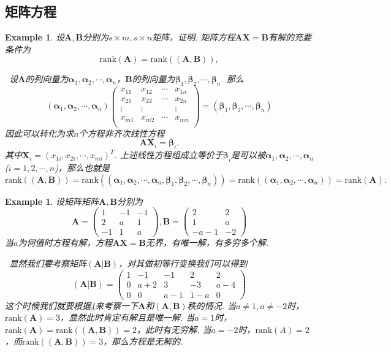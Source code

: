 \documentclass{article}
\newtheorem{example}[theorem]{Example}
\newcommand{\hints}{{\color{blue} \text{hints}}}
\newcommand{\mbf}[1]{\bm{#1}}
\newcommand{\rank}[1]{\text{rank}\left(#1\right)} %
\begin{document}
\subsection{矩阵方程}

\begin{example}\label{matrix-equation-1}
\rm 设$\mbf{A},\mbf{B}$分别为$s \times m,s \times n$矩阵，证明: 矩阵方程$\mbf{A}\mbf{X} = \mbf{B}$有解的充要条件为
$$
\rank{\mbf{A}} = \rank{(\mbf{A},\mbf{B})},
$$

\hints\ 设$\mbf{A}$的列向量为$\mbf{\alpha}_1,\mbf{\alpha}_2,\cdots,\mbf{\alpha}_n$，$\mbf{B}$的列向量为$\mbf{\beta}_1,\mbf{\beta}_2,\cdots,\mbf{\beta}_n$. 那么
$$
(\mbf{\alpha}_1,\mbf{\alpha}_2,\cdots,\mbf{\alpha}_n)\begin{pmatrix}
x_{11} & x_{12} & \cdots & x_{1n} \\
x_{21} & x_{22} & \cdots & x_{2n} \\
\vdots & \vdots &  & \vdots \\
x_{m1} & x_{m2} & \cdots & x_{mn} \\
\end{pmatrix} = (\mbf{\beta}_1,\mbf{\beta}_2,\cdots,\mbf{\beta}_n)
$$
因此可以转化为求$n$个方程非齐次线性方程
$$
\mbf{A} \mbf{X}_i = \mbf{\beta}_i.  
$$
其中$\mbf{X}_i = (x_{1i},x_{2i},\cdots,x_{mi})^T$. 上述线性方程组成立等价于$\mbf{\beta}_{i}$是可以被$\mbf{\alpha}_1,\mbf{\alpha}_2,\cdots,\mbf{\alpha}_n$($i=1,2,\cdots,n$)，那么也就是
$$
\rank{(\mbf{A},\mbf{B})} = \rank{(\mbf{\alpha}_1,\mbf{\alpha}_2,\cdots,\mbf{\alpha}_n,\mbf{\beta}_1,\mbf{\beta}_2,\cdots,\mbf{\beta}_n)} = \rank{(\mbf{\alpha}_1,\mbf{\alpha}_2,\cdots,\mbf{\alpha}_n)} = \rank{\mbf{A}}.
$$
\end{example}

\begin{example}
\rm 设矩阵矩阵$\mbf{A},\mbf{B}$分别为
$$
\mbf{A} = \begin{pmatrix}
1 & -1 & -1 \\
2 & a & 1 \\
-1 & 1 & a 
\end{pmatrix},
\mbf{B} = \begin{pmatrix}
2 & 2 \\
1 & a \\
-a-1 & -2 
\end{pmatrix}
$$
当$a$为何值时方程有解，方程$\mbf{AX} = \mbf{B}$无界，有唯一解，有多穷多个解. 

\hints\ 显然我们要考察矩阵$(\mbf{A} | \mbf{B})$，对其做初等行变换我们可以得到
$$
(\mbf{A} | \mbf{B}) = \left(\begin{array}{ccc|cc}
1 & -1 & -1 & 2 & 2 \\
0 & a+2 & 3 & -3 & a-4 \\
0 & 0 & a-1 & 1-a & 0
\end{array}\right)
$$
这个时候我们就要根据\ref{matrix-equation-1}来考察一下$\mbf{A}$和$(\mbf{A},\mbf{B})$秩的情况. 当$a \neq 1, a \neq -2$时，$\rank{\mbf{A}} = 3$，显然此时肯定有解且是唯一解. 当$a = 1$时，$\rank{\mbf{A}} = \rank{(\mbf{A},\mbf{B})} = 2$，此时有无穷解. 当$a = -2$时，$\rank{A} = 2$，而$\rank{(\mbf{A},\mbf{B})}=3$，那么方程是无解的. 
\end{example}
\end{document}

